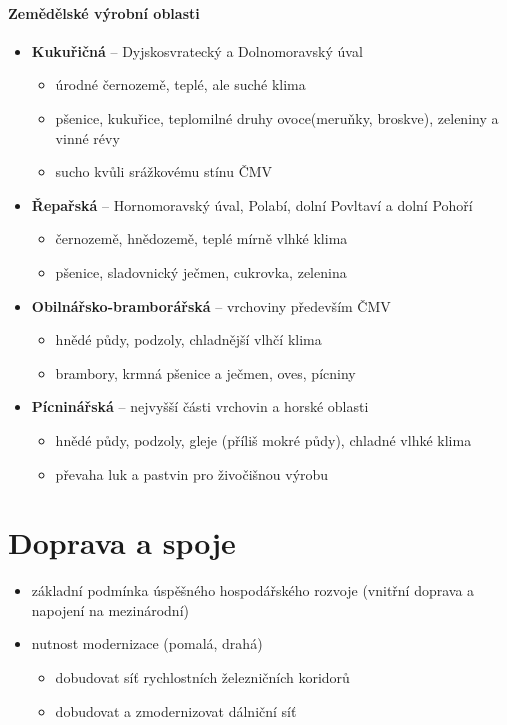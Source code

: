 \paragraph{Zemědělské výrobní oblasti}
\begin{itemize}
\item \textbf{Kukuřičná} -- Dyjskosvratecký a Dolnomoravský úval
	\begin{itemize}
	\item úrodné černozemě, teplé, ale suché klima
	\item pšenice, kukuřice, teplomilné druhy ovoce(meruňky, broskve), zeleniny a vinné révy
	\item sucho kvůli srážkovému stínu ČMV
	\end{itemize}
\item \textbf{Řepařská} -- Hornomoravský úval, Polabí, dolní Povltaví a dolní Pohoří
	\begin{itemize}
	\item černozemě, hnědozemě, teplé mírně vlhké klima
	\item pšenice, sladovnický ječmen, cukrovka, zelenina
	\end{itemize}
\item \textbf{Obilnářsko-bramborářská} -- vrchoviny především ČMV
	\begin{itemize}
	\item hnědé půdy, podzoly, chladnější vlhčí klima
	\item brambory, krmná pšenice a ječmen, oves, pícniny
	\end{itemize}
\item \textbf{Pícninářská} --  nejvyšší části vrchovin a horské oblasti
	\begin{itemize}
	\item hnědé půdy, podzoly, gleje (příliš mokré půdy), chladné vlhké klima
	\item převaha luk a pastvin pro živočišnou výrobu
	\end{itemize}
\end{itemize}


\section{Doprava a spoje}
\begin{itemize}
\item základní podmínka úspěšného hospodářského rozvoje (vnitřní doprava a napojení na mezinárodní)
\item nutnost modernizace (pomalá, drahá)
	\begin{itemize}
	\item dobudovat síť rychlostních železničních koridorů
	\item dobudovat a zmodernizovat dálniční síť		
	\end{itemize}
\end{itemize}

